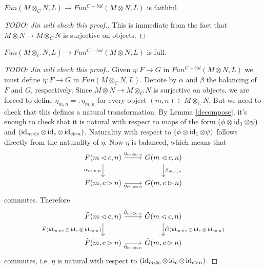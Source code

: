 \begin{lemma}\label{faithful}
  $Fun(M\otimes_C N,L)\to Fun^{C-bal}(M\otimes N,L)$ is faithful.
\end{lemma}

\begin{proof}
  [TODO: Jin will check this proof.]
  This is immediate from the fact that $M\otimes N \to M\otimes_C N$ is
  surjective on objects.
\end{proof}

\begin{lemma}\label{full}
  $Fun(M\otimes_C N,L)\to Fun^{C-bal}(M\otimes N,L)$ is full.
\end{lemma}

\begin{proof}
  [TODO: Jin will check this proof.]
  Given $\eta:F\to G$ in $Fun^{C-bal}(M\otimes N,L)$ we must define
  $\tilde{\eta}:\tilde{F}\to\tilde{G}$ in $Fun(M\otimes_C N,L)$. Denote by
  $\alpha$ and $\beta$ the balancing of $F$ and $G$, respectively. Since
  $M\otimes N\to M\otimes_C N$ is surjective on objects, we are forced to
  define $\tilde{\eta}_{m,n}=:\eta_{m,n}$ for every object
  $(m,n)\in M\otimes_C N$. But we need to check that this defines a natural
  transformation. By Lemma \ref{decompose}, it's enough to check that it is
  natural with respect to maps of the form $(\phi\otimes\operatorname{id}_1\otimes\psi)$ and
  $(\operatorname{id}_{m\lhd c}\otimes\operatorname{id}_c\otimes\operatorname{id}_{c\rhd n})$. Naturality with respect
  to $(\phi\otimes\operatorname{id}_1\otimes\psi)$ follows directly from the naturality of
  $\eta$. Now $\eta$ is balanced, which means that
  \[
    \begin{tikzcd}
      {F(m\lhd c, n)} & {G(m\lhd c, n)} \\
      {F(m,c\rhd n)} & {G(m,c\rhd n)}
      \arrow["{\eta_{m\lhd c, n}}", from=1-1, to=1-2]
      \arrow["{\alpha_{m,c,n}}"', from=1-1, to=2-1]
      \arrow["{\beta_{m,c,n}}", from=1-2, to=2-2]
      \arrow["{\eta_{m,c\rhd n}}"', from=2-1, to=2-2]
    \end{tikzcd}\]
  commutes. Therefore
  \[
    \begin{tikzcd}
      {\tilde{F}(m\lhd c, n)} & {\tilde{G}(m\lhd c, n)} \\
      {\tilde{F}(m,c\rhd n)} & {\tilde{G}(m,c\rhd n)}
      \arrow["{\tilde{\eta}_{m\lhd c, n}}", from=1-1, to=1-2]
      \arrow["{\tilde{F}(\id_{m\lhd c}\otimes\id_c\otimes\id_{c\rhd n})}"', from=1-1, to=2-1]
      \arrow["{\tilde{G}(\id_{m\lhd c}\otimes\id_c\otimes\id_{c\rhd n})}", from=1-2, to=2-2]
      \arrow["{\tilde{\eta}_{m,c\rhd n}}"', from=2-1, to=2-2]
    \end{tikzcd}
  \]
  commutes, i.e. $\eta$ is natural with respect to
  $(\operatorname{id}_{m\lhd c}\otimes\operatorname{id}_c\otimes\operatorname{id}_{c\rhd n})$.
\end{proof}

